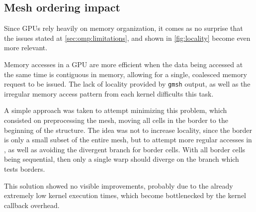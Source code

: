 \subsection{Mesh ordering impact}
\label{subsec:cuda:ordering}


Since GPUs rely heavily on memory organization, it comes as no surprise that the issues stated at \cref{sec:omp:limitations}, and shown in \cref{fig:locality} become even more relevant.

Memory accesses in a GPU are more efficient when the data being accessed at the same time is contiguous in memory, allowing for a single, coalesced memory request to be issued. The lack of locality provided by \texttt{gmsh} output, as well as the irregular memory access pattern from each kernel difficults this task.

A simple approach was taken to attempt minimizing this problem, which consisted on preprocessing the mesh, moving all cells in the border to the beginning of the structure.
The idea was not to increase locality, since the border is only a small subset of the entire mesh, but to attempt more regular accesses in \computeflux, as well as avoiding the divergent branch for border cells.
With all border cells being sequential, then only a single warp should diverge on the branch which tests borders.

This solution showed no visible improvements, probably due to the already extremely low kernel execution times, which become bottlenecked by the kernel callback overhead. 
